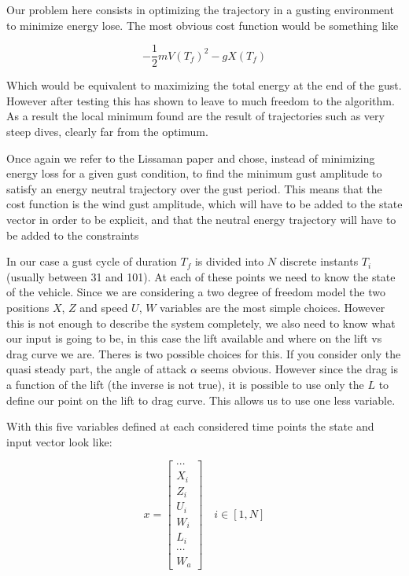 Our problem here consists in optimizing the trajectory in a gusting environment to minimize energy lose.
The most obvious cost function would be something like

\begin{equation}
  - \frac{1}{2}m{V(T_f)}^2 - gX(T_f)
  \label{eqn:eni_cost_fun}
\end{equation}

Which would be equivalent to maximizing the total energy at the end of the gust.
However after testing this has shown to leave to much freedom to the algorithm. 
As a result the local minimum found are the result of trajectories such as very steep dives, clearly far from the optimum.

\par Once again we refer to the Lissaman paper \cite{Lissaman2007neutral} and chose, instead of minimizing energy loss for a given gust condition, to find the minimum gust amplitude to satisfy an energy neutral trajectory over the gust period.
This means that the cost function is the wind gust amplitude, which will have to be added to the state vector in order to be explicit, and that the neutral energy trajectory will have to be added to the constraints

In our case a gust cycle of duration $T_f$ is divided into $N$ discrete instants $T_i$ (usually between 31 and 101).
At each of these points we need to know the state of the vehicle.
Since we are considering a two degree of freedom model the two positions $X$, $Z$ and speed $U$, $W$ variables are the most simple choices.
However this is not enough to describe the system completely, we also need to know what our input is going to be, in this case the lift available and where on the lift vs drag curve we are.
Theres is two possible choices for this.
If you consider only the quasi steady part, the angle of attack $\alpha$ seems obvious.
However since the drag is a function of the lift (the inverse is not true), it is possible to use only the $L$ to define our point on the lift to drag curve.
This allows us to use one less variable.

\par With this five variables defined at each considered time points the state and input vector look like:

\begin{equation}
  x= 
  \begin{bmatrix}
    \cdots \\
    X_i \\
    Z_i \\
    U_i \\
    W_i \\
    L_i \\
    \cdots \\
    W_a
  \end{bmatrix}
  \quad i \in [1,N]
  \label{eqn:big_vector}
\end{equation}

